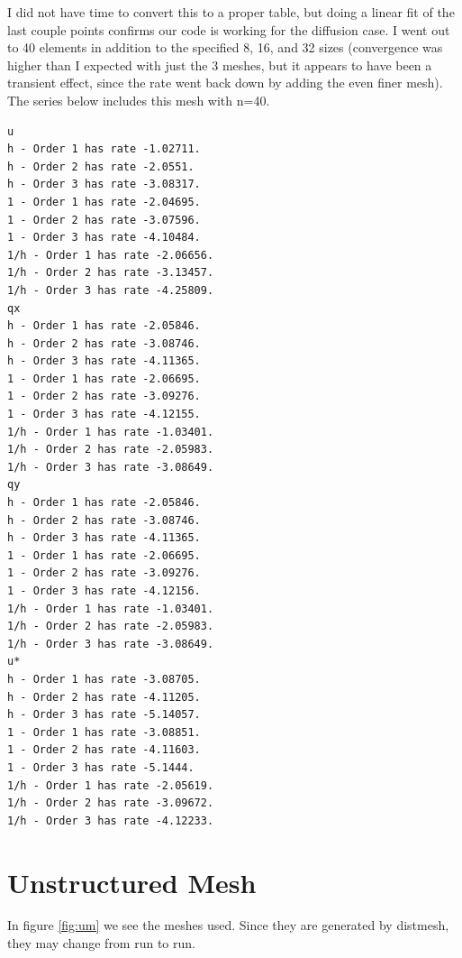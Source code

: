 \documentclass{article}
\begin{document}
I did not have time to convert this to a proper table, but doing a linear fit of the last couple points confirms our code is working for the diffusion case.
I went out to 40 elements in addition to the specified 8, 16, and 32 sizes (convergence was higher than I expected with just the 3 meshes, but it appears to have been a transient effect, since the rate went back down by adding the even finer mesh).
The series below includes this mesh with n=40.
\begin{verbatim}
u
h - Order 1 has rate -1.02711.
h - Order 2 has rate -2.0551.
h - Order 3 has rate -3.08317.
1 - Order 1 has rate -2.04695.
1 - Order 2 has rate -3.07596.
1 - Order 3 has rate -4.10484.
1/h - Order 1 has rate -2.06656.
1/h - Order 2 has rate -3.13457.
1/h - Order 3 has rate -4.25809.
qx
h - Order 1 has rate -2.05846.
h - Order 2 has rate -3.08746.
h - Order 3 has rate -4.11365.
1 - Order 1 has rate -2.06695.
1 - Order 2 has rate -3.09276.
1 - Order 3 has rate -4.12155.
1/h - Order 1 has rate -1.03401.
1/h - Order 2 has rate -2.05983.
1/h - Order 3 has rate -3.08649.
qy
h - Order 1 has rate -2.05846.
h - Order 2 has rate -3.08746.
h - Order 3 has rate -4.11365.
1 - Order 1 has rate -2.06695.
1 - Order 2 has rate -3.09276.
1 - Order 3 has rate -4.12156.
1/h - Order 1 has rate -1.03401.
1/h - Order 2 has rate -2.05983.
1/h - Order 3 has rate -3.08649.
u*
h - Order 1 has rate -3.08705.
h - Order 2 has rate -4.11205.
h - Order 3 has rate -5.14057.
1 - Order 1 has rate -3.08851.
1 - Order 2 has rate -4.11603.
1 - Order 3 has rate -5.1444.
1/h - Order 1 has rate -2.05619.
1/h - Order 2 has rate -3.09672.
1/h - Order 3 has rate -4.12233.
\end{verbatim}

\clearpage

\section{Unstructured Mesh}

In figure \ref{fig:um} we see the meshes used.
Since they are generated by distmesh, they may change from run to run.
\end{document}
